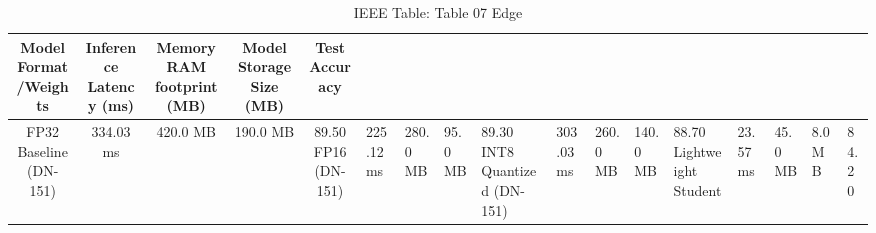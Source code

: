 \begin{table}[htbp]
\caption{IEEE Table: Table 07 Edge}
\label{tab:table_07_edge}
\centering
\begin{tabular}{|c|c|c|c|c|}
\hline
Model Format/Weights & Inference Latency (ms) & Memory RAM footprint (MB) & Model Storage Size (MB) & Test Accuracy \\
\hline\hline
FP32 Baseline (DN-151) & 334.03 ms & 420.0 MB & 190.0 MB & 89.50%
\hline
FP16 (DN-151) & 225.12 ms & 280.0 MB & 95.0 MB & 89.30%
\hline
INT8 Quantized (DN-151) & 303.03 ms & 260.0 MB & 140.0 MB & 88.70%
\hline
Lightweight Student & 23.57 ms & 45.0 MB & 8.0 MB & 84.20%
\hline
\end{tabular}
\end{table}
